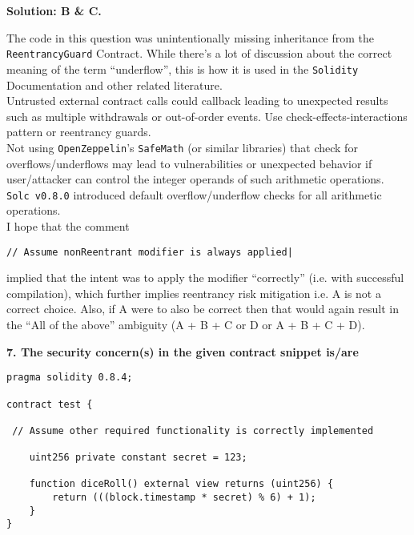 \textbf{Solution: B \& C.}

The code in this question was unintentionally missing inheritance from the \verb|ReentrancyGuard| Contract.
While there's a lot of discussion about the correct meaning of the term ``underflow'', this is how it is used in the \verb|Solidity| Documentation and other related literature.\\

Untrusted external contract calls could callback leading to unexpected results such as multiple withdrawals or out-of-order events.
Use check-effects-\linebreak interactions pattern or reentrancy guards.\\

Not using \verb|OpenZeppelin|'s \verb|SafeMath| (or similar libraries) that check for overflows/underflows may lead to vulnerabilities or unexpected behavior if user/attacker can control the integer operands of such arithmetic operations.\linebreak
\verb|Solc v0.8.0| introduced default overflow/underflow checks for all arithmetic operations.\\

I hope that the comment

\begin{lstlisting}[language=Solidity, style=solStyle]
// Assume nonReentrant modifier is always applied|
\end{lstlisting}

implied that the intent was to apply the modifier ``correctly'' (i.e. with successful compilation), which further implies reentrancy risk mitigation i.e. A is not a correct choice.
Also, if A were to also be correct then that would again result in the ``All of the above'' ambiguity (A + B + C or D or A + B + C + D).\\

\pagebreak

\textbf{7. The security concern(s) in the given contract snippet is/are}\label{sec:exam4_q7}

\begin{lstlisting}[language=Solidity, style=solStyle]
pragma solidity 0.8.4;

contract test {

 // Assume other required functionality is correctly implemented

    uint256 private constant secret = 123;

    function diceRoll() external view returns (uint256) {
        return (((block.timestamp * secret) % 6) + 1);
    }
}
\end{lstlisting}

